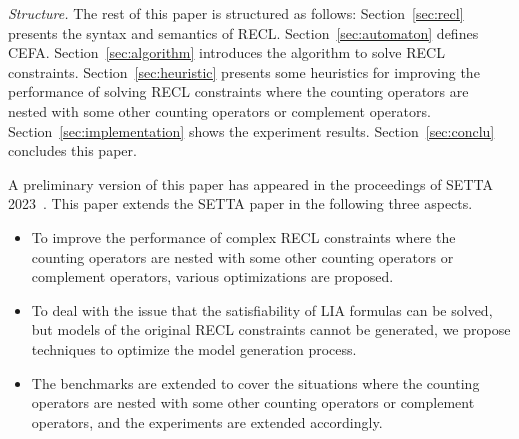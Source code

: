 
\smallskip
\noindent
\emph{Structure.} 
The rest of this paper is structured as follows:  
Section~\ref{sec:recl} presents the syntax and semantics of RECL. 
Section~\ref{sec:automaton} defines CEFA. Section~\ref{sec:algorithm} introduces the algorithm to solve RECL constraints. 
Section~\ref{sec:heuristic} presents some heuristics for improving the performance of solving RECL constraints where the counting operators are nested with some other counting operators or complement operators. Section~\ref{sec:implementation} shows the experiment results. Section~\ref{sec:conclu} concludes this paper.

\smallskip

A preliminary version of this paper has appeared in the proceedings of SETTA 2023~\cite{Denghang2023}. This paper extends the SETTA paper in the following three aspects.
\begin{itemize}
\item To improve the performance of complex RECL constraints where the counting operators are nested with some other counting operators or complement operators, various optimizations are proposed. 
\item To deal with the issue that the satisfiability of LIA formulas can be solved, but models of the original RECL constraints cannot be generated, we propose techniques to optimize the model generation process.  
\item The benchmarks are extended to cover the situations where the counting operators are nested with some other counting operators or complement operators, and the experiments are extended accordingly.  
\end{itemize}